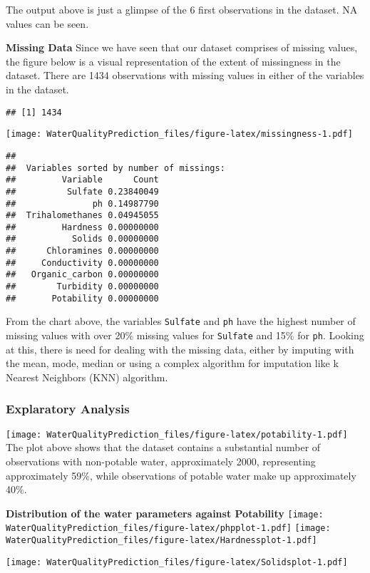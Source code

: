 \documentclass[
]{article}
\begin{document}
The output above is just a glimpse of the 6 first observations in the
dataset. NA values can be seen.

\textbf{Missing Data} Since we have seen that our dataset comprises of
missing values, the figure below is a visual representation of the
extent of missingness in the dataset. There are 1434 observations with
missing values in either of the variables in the dataset.

\begin{verbatim}
## [1] 1434
\end{verbatim}

\texttt{[image: WaterQualityPrediction\_files/figure-latex/missingness-1.pdf]}

\begin{verbatim}
## 
##  Variables sorted by number of missings: 
##         Variable      Count
##          Sulfate 0.23840049
##               ph 0.14987790
##  Trihalomethanes 0.04945055
##         Hardness 0.00000000
##           Solids 0.00000000
##      Chloramines 0.00000000
##     Conductivity 0.00000000
##   Organic_carbon 0.00000000
##        Turbidity 0.00000000
##       Potability 0.00000000
\end{verbatim}

From the chart above, the variables \texttt{Sulfate} and \texttt{ph}
have the highest number of missing values with over 20\% missing values
for \texttt{Sulfate} and 15\% for \texttt{ph}. Looking at this, there is
need for dealing with the missing data, either by imputing with the
mean, mode, median or using a complex algorithm for imputation like k
Nearest Neighbors (KNN) algorithm.

\subsubsection{Explaratory Analysis}\label{explaratory-analysis}

\texttt{[image: WaterQualityPrediction\_files/figure-latex/potability-1.pdf]}
The plot above shows that the dataset contains a substantial number of
observations with non-potable water, approximately 2000, representing
approximately 59\%, while observations of potable water make up
approximately 40\%.

\textbf{Distribution of the water parameters against Potability}
\texttt{[image: WaterQualityPrediction\_files/figure-latex/phpplot-1.pdf]}
\texttt{[image: WaterQualityPrediction\_files/figure-latex/Hardnessplot-1.pdf]}

\texttt{[image: WaterQualityPrediction\_files/figure-latex/Solidsplot-1.pdf]}
\end{document}
